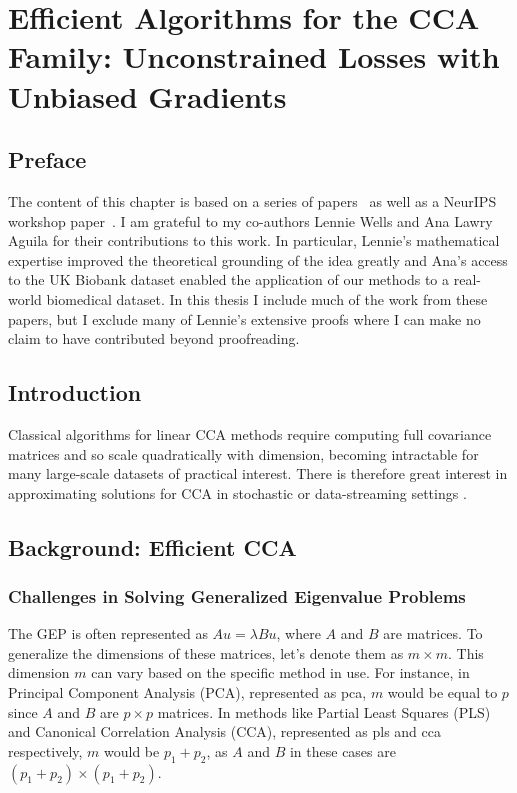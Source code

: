 \graphicspath{{chapters/gradient_descent/}}


\chapter{Efficient Algorithms for the CCA Family: Unconstrained Losses with Unbiased Gradients}\label{chap:gradient_descent}
\minitoc
\section*{Preface}
The content of this chapter is based on a series of papers~\citep{chapman2022generalized, chapman2023efficient} as well as a NeurIPS workshop paper~\citep{chapman2023cca}.
I am grateful to my co-authors Lennie Wells and Ana Lawry Aguila for their contributions to this work.
In particular, Lennie's mathematical expertise improved the theoretical grounding of the idea greatly and Ana's access to the UK Biobank dataset enabled the application of our methods to a real-world biomedical dataset.
In this thesis I include much of the work from these papers, but I exclude many of Lennie's extensive proofs where I can make no claim to have contributed beyond proofreading.

\section{Introduction}

Classical algorithms for linear CCA methods require computing full covariance matrices and so scale quadratically with dimension, becoming intractable for many large-scale datasets of practical interest.
There is therefore great interest in approximating solutions for CCA in stochastic or data-streaming settings \citep{arora2012stochastic}.

\section{Background: Efficient CCA}\label{sec:background-unified}

\subsection{Challenges in Solving Generalized Eigenvalue Problems}

The GEP is often represented as \( Au = \lambda Bu \), where \( A \) and \( B \) are matrices. To generalize the dimensions of these matrices, let's denote them as \( m \times m \). This dimension \( m \) can vary based on the specific method in use. For instance, in Principal Component Analysis (PCA), represented as \acrshort{pca}, \( m \) would be equal to \( p \) since \( A \) and \( B \) are \( p \times p \) matrices. In methods like Partial Least Squares (PLS) and Canonical Correlation Analysis (CCA), represented as \acrshort{pls} and \acrshort{cca} respectively, \( m \) would be \( p_1+p_2 \), as \( A \) and \( B \) in these cases are \( (p_1+p_2) \times (p_1+p_2) \).

